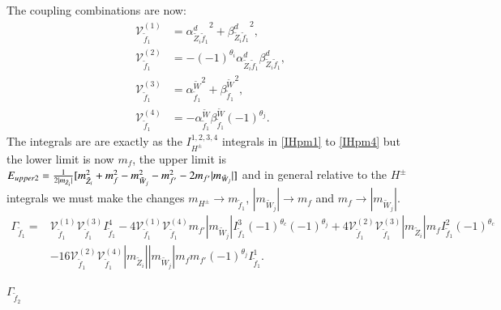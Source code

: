 \documentclass[final,3p,times,pdflatex]{elsarticle}
\begin{document}
The coupling combinations are now:
\begin{align}
\mathcal{V}_{\tilde{f}_1}^{(1)} &= {\alpha_{\tilde{Z}_i \tilde{f}_1}^{d}}^2 + {\beta_{\tilde{Z}_i \tilde{f}_1}^{d}}^2, \\
\mathcal{V}_{\tilde{f}_1}^{(2)} &= -(-1)^{\theta_i}{\alpha_{\tilde{Z}_i \tilde{f}_1}^{d}} {\beta_{\tilde{Z}_i \tilde{f}_1}^{d}}, \\
\mathcal{V}_{\tilde{f}_1}^{(3)} &= {\alpha_{\tilde{f}_1}^{\tilde{W}}}^2 + {\beta_{\tilde{f}_1}^{\tilde{W}}}^2, \\
\mathcal{V}_{\tilde{f}_1}^{(4)} &= -\alpha_{\tilde{f}_1}^{\tilde{W}} \beta_{\tilde{f}_1}^{\tilde{W}}(-1)^{\theta_j}.
\end{align}
The integrals are are exactly as the $I_{H^{\pm}}^{1,2,3,4}$ integrals in \eqref{IHpm1} to \eqref{IHpm4} but the lower limit is now $m_{f}$, the upper limit is $E_{upper2} = {1 \over 2|m_{\tilde{Z}_i}|}[m_{\tilde{Z}_i}^2 + m_{f}^2 - m_{\tilde{W}_j}^2 - m_{f'}^2 - 2m_{f'}|m_{\tilde{W}_j}|]$ and in general relative to the $H^{\pm}$ integrals we must make the changes $m_{H^{\pm}} \rightarrow m_{\tilde{f}_1}$, $|m_{\tilde{W}_j}| \rightarrow m_{f}$ and $m_f \rightarrow |m_{\tilde{W}_j}|$.
\begin{equation}
\begin{aligned}
\Gamma_{\tilde{f}_1} = & \mathcal{V}_{\tilde{f}_1}^{(1)} \mathcal{V}_{\tilde{f}_1}^{(3)} I_{\tilde{f}_1}^{4} - 4 \mathcal{V}_{\tilde{f}_1}^{(1)} \mathcal{V}_{\tilde{f}_1}^{(4)} m_{f'} |m_{\tilde{W}_j}| I_{\tilde{f}_1}^{3} (-1)^{\theta_c}(-1)^{\theta_j} + 4 \mathcal{V}_{\tilde{f}_1}^{(2)} \mathcal{V}_{\tilde{f}_1}^{(3)} |m_{\tilde{Z}_i}|m_{f} I_{\tilde{f}_1}^{2}(-1)^{\theta_c} \\ & - 16 \mathcal{V}_{\tilde{f}_1}^{(2)}  \mathcal{V}_{\tilde{f}_1}^{(4)} |m_{\tilde{Z}_i}||m_{\tilde{W}_j}|m_{f}m_{f'}(-1)^{\theta_j}I_{\tilde{f}_1}^{1}.
\end{aligned}
\end{equation}

\textbf{\underline{$\Gamma_{\tilde{f}_2}$}}
\end{document}
